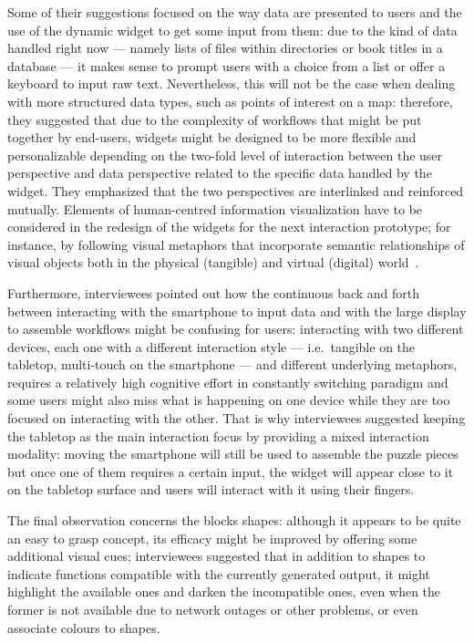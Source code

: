 Some of their suggestions focused on the way data are presented to users and the use of the dynamic widget to get some input from them: due to the kind of data handled right now --- namely lists of files within directories or book titles in a database --- it makes sense to prompt users with a choice from a list or offer a keyboard to input raw text. Nevertheless, this will not be the case when dealing with more structured data types, such as points of interest on a map: therefore, they suggested that due to the complexity of workflows that might be put together by end-users, widgets might be designed to be more flexible and personalizable depending on the two-fold level of interaction between the user perspective and data perspective related to the specific data handled by the widget. They emphasized that the two perspectives are interlinked and reinforced mutually. Elements of human-centred information visualization have to be considered in the redesign of the widgets for the next interaction prototype; for instance, by following visual metaphors that incorporate semantic relationships of visual objects both in the physical (tangible) and virtual (digital) world~\cite{Majumder:2013wt,Bigelow:2014th}.

Furthermore, interviewees pointed out how the continuous back and forth between interacting with the smartphone to input data and with the large display to assemble workflows might be confusing for users: interacting with two different devices, each one with a different interaction style --- i.e.\ tangible on the tabletop, multi-touch on the smartphone --- and different underlying metaphors, requires a relatively high cognitive effort in constantly switching paradigm and some users might also miss what is happening on one device while they are too focused on interacting with the other. That is why interviewees suggested keeping the tabletop as the main interaction focus by providing a mixed interaction modality: moving the smartphone will still be used to assemble the puzzle pieces but once one of them requires a certain input, the widget will appear close to it on the tabletop surface and users will interact with it using their fingers.

The final observation concerns the blocks shapes: although it appears to be quite an easy to grasp concept, its efficacy might be improved by offering some additional visual cues; interviewees suggested that in addition to shapes to indicate functions compatible with the currently generated output, it might highlight the available ones and darken the incompatible ones, even when the former is not available due to network outages or other problems, or even associate colours to shapes.

